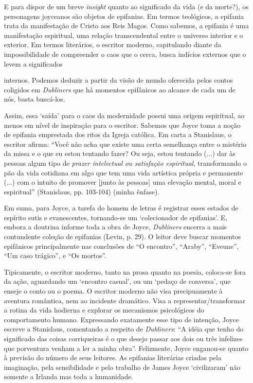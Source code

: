 E para dispor de um breve \textit{insight} quanto ao significado da vida (e da
morte?), os personagens joyceanos são objetos de epifanias. Em termos
teológicos, a epifania trata da manifestação de Cristo aos Reis Magos.
Como sabemos, a epifania é uma manifestação espiritual, uma relação
transcendental entre o universo interior e o exterior. Em termos
literários, o escritor moderno, capitulando diante da
impossibilidade de compreender o caos que o cerca, busca indícios
externos que o levem a significados

internos. Podemos deduzir a partir da visão de mundo oferecida pelos
contos coligidos em \textit{Dubliners} que há momentos epifânicos ao alcance de
cada um de nós, basta buscá-los.

Assim, essa `saída' para o caos da modernidade possui uma origem
espiritual, ao menos em nível de inspiração para o escritor. Sabemos
que Joyce toma a noção de epifania emprestada dos ritos da Igreja
católica. Em carta a Stanislaus, o escritor afirma: ``Você não acha
que existe uma certa semelhança entre o mistério da missa e o que eu
estou tentando fazer? Ou seja, estou tentando (...) dar às pessoas
algum tipo de \textit{prazer intelectual ou satisfação espiritual},
transformando o pão da vida cotidiana em algo que tem uma vida
artística própria e permanente (...) com o intuito de promover [junto
às pessoas] uma elevação mental, moral e espiritual'' (Stanislaus,
pp. 103-104) (minha ênfase).

Em suma, para Joyce, a tarefa do homem de letras é registrar esses
estados de espírito sutis e evanescentes, tornando-se um
`colecionador de epifanias'. E, embora a doutrina informe toda a
obra de Joyce, \textit{Dubliners} encerra a mais contundente coleção de
epifanias (Levin, p. 29). O leitor deve buscar momentos epifânicos
principalmente nas conclusões de ``O encontro'', ``Araby'',
``Eveune'', ``Um caso trágico'', e ``Os mortos''.

Tipicamente, o escritor moderno, tanto na prosa quanto na poesia,
coloca-se fora da ação, aguardando um `encontro casual', ou um
`pedaço de conversa', que enseje o conto ou o poema. O escritor
moderno não visa precipuamente à aventura romântica, nem ao incidente
dramático. Visa a representar/transformar a rotina da vida hodierna e
explorar os mecanismos psicológicos do comportamento humano.
Expressando exatamente esse tipo de intenção, Joyce escreve a
Stanislaus, comentando a respeito de \textit{Dubliners}: ``A idéia que tenho
do significado das coisas corriqueiras é o que desejo passar aos
dois ou três infelizes que porventura venham a ler a minha obra''.
Felizmente, Joyce enganou-se quanto à previsão do número de seus
leitores. As epifanias literárias criadas pela imaginação, pela
sensibilidade e pelo trabalho de James Joyce `civilizaram' não
somente a Irlanda mas toda a humanidade.


